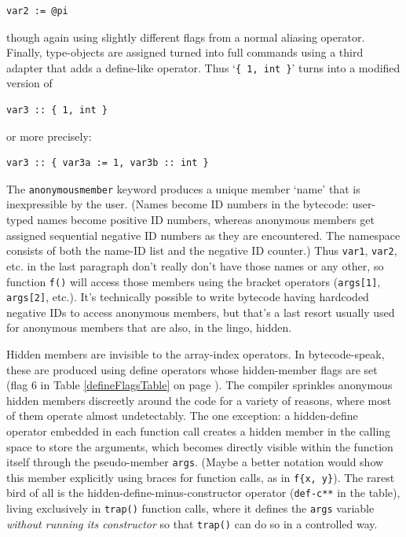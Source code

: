 \documentclass{article}
\newenvironment{code}{
       \begin{list}{}{
               \setlength{\leftmargin}{.4in}
               \setlength{\rightmargin}{0in}
               \setlength{\topsep}{.2in}
       }
       \small
       \item[] }
       { \end{list}   }
\begin{document}
\begin{code} \begin{verbatim}
var2 := @pi
\end{verbatim} \end{code}

\noindent though again using slightly different flags from a normal aliasing operator.  Finally, type-objects are assigned turned into full commands using a third adapter that adds a define-like operator.  Thus `\verb#{ 1, int }#' turns into a modified version of

\begin{code} \begin{verbatim}
var3 :: { 1, int }
\end{verbatim} \end{code}

\noindent or more precisely:

\begin{code} \begin{verbatim}
var3 :: { var3a := 1, var3b :: int }
\end{verbatim} \end{code}

The \verb#anonymousmember# keyword produces a unique member `name' that is inexpressible by the user.  (Names become ID numbers in the bytecode:  user-typed names become positive ID numbers, whereas anonymous members get assigned sequential negative ID numbers as they are encountered.  The namespace consists of both the name-ID list and the negative ID counter.)  Thus \verb#var1#, \verb#var2#, etc. in the last paragraph don't really don't have those names or any other, so function \verb#f()# will access those members using the bracket operators (\verb#args[1]#, \verb#args[2]#, etc.).  It's technically possible to write bytecode having hardcoded negative IDs to access anonymous members, but that's a last resort usually used for anonymous members that are also, in the lingo, hidden.

Hidden members are invisible to the array-index operators.  In bytecode-speak, these are produced using define operators whose hidden-member flags are set (flag 6 in Table \ref{defineFlagsTable} on page \pageref{defineFlagsTable}).  The compiler sprinkles anonymous hidden members discreetly around the code for a variety of reasons, where most of them operate almost undetectably.  The one exception:  a hidden-define operator embedded in each function call creates a hidden member in the calling space to store the arguments, which becomes directly visible within the function itself through the pseudo-member \verb#args#.  (Maybe a better notation would show this member explicitly using braces for function calls, as in \verb#f{x, y}#).  The rarest bird of all is the hidden-define-minus-constructor operator (\verb#def-c**# in the table), living exclusively in \verb#trap()# function calls, where it defines the \verb#args# variable \emph{without running its constructor} so that \verb#trap()# can do so in a controlled way.
\end{document}
